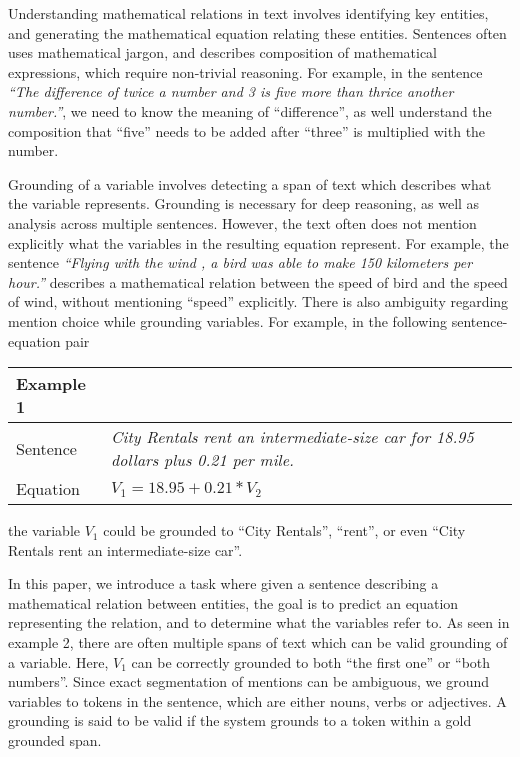   Understanding mathematical relations in text involves identifying
  key entities, and generating the mathematical equation relating these
  entities. Sentences often uses mathematical jargon, and describes
  composition of mathematical expressions, which require non-trivial
  reasoning. For example, in the sentence {\em``The difference of twice a
  number and 3 is five more than thrice another number.''}, we need to
  know the meaning of ``difference'', as well understand the
  composition that ``five'' needs to be added after ``three'' is
  multiplied with the number.

  Grounding of a variable involves detecting a span of text which
  describes what the variable represents.  Grounding is necessary for
  deep reasoning, as well as analysis across multiple
  sentences. However, the text often does not mention explicitly what
  the variables in the resulting equation represent. For example, the
  sentence {\em``Flying with the wind , a bird was able to make 150
  kilometers per hour.''}  describes a mathematical relation between
  the speed of bird and the speed of wind, without mentioning
  ``speed'' explicitly. There is also ambiguity regarding mention
  choice while grounding variables. For example, in the following
  sentence-equation pair

  \setlength{\tabcolsep}{6pt}
  \begin{table}[H]
   \centering \small
   \begin{tabular}{|lp{5cm}|}
     \hline Example 1 &  \\
     \hline Sentence & {\em City Rentals rent an intermediate-size car
  for 18.95 dollars plus 0.21 per mile.} \\
     \hline Equation & $V_1=18.95+0.21*V_2$ \\
     \hline 
   \end{tabular}
   \label{tab:example1}
  \end{table}
  
  \noindent the variable $V_1$ could be grounded to ``City Rentals'',
  ``rent'', or even ``City Rentals rent an intermediate-size car''.

  In this paper, we introduce a task where given a sentence describing
  a mathematical relation between entities, the goal is to predict an
  equation representing the relation, and to determine what the
  variables refer to. As seen in example 2, there are often multiple
  spans of text which can be valid grounding of a variable. Here,
  $V_1$ can be correctly grounded to both ``the first one'' or ``both
  numbers''. Since exact segmentation of mentions can be ambiguous, we
  ground variables to tokens in the sentence, which are either nouns,
  verbs or adjectives. A grounding is said to be valid if the system
  grounds to a token within a gold grounded span.
  
